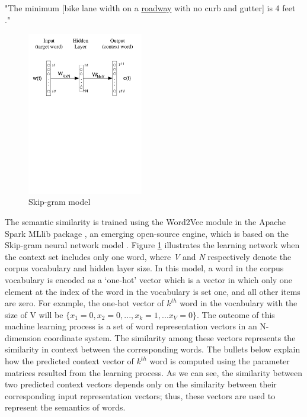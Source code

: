 \documentclass[Journal, BackFigs,NoLists, DoubleSpace]{ascelike}%
\begin{document}
%
\begin{center}
	"The minimum [bike lane width on a \underline{roadway} with no curb and gutter] is 4 feet ."
\end{center}
%
\begin{figure}[t]
	\centering
	\includegraphics[width=0.45\textwidth]{Figure4_skip-gram-model}
	\caption{Skip-gram model}
	\label{fig:skip-gram}
\end{figure}
%
The semantic similarity is trained using the Word2Vec module in the Apache Spark MLlib package \cite{apache16}, an emerging open-source engine, which is based on the Skip-gram neural network model \cite{mikolov13a}. Figure \ref{fig:skip-gram} illustrates the learning network when the context set includes only one word, where \textit{V} and \textit{N} respectively denote the corpus vocabulary and hidden layer size. In this model, a word in the corpus vocabulary is encoded as a `one-hot' vector which is a vector in which only one element at the index of the word in the vocabulary is set one, and all other items are zero. For example, the one-hot vector of $k^{th}$ word in the vocabulary with the size of V will be $\{x_1=0, x_2=0, ..., x_k=1,...x_V=0\}$. The outcome of this machine learning process is a set of word representation vectors in an N-dimension coordinate system. The similarity among these vectors represents the similarity in context between the corresponding words. The bullets below explain how the predicted context vector of $k^{th}$ word is computed using the parameter matrices resulted from the learning process. As we can see, the similarity between two predicted context vectors depends only on the similarity between their corresponding input representation vectors; thus, these vectors are used to represent the semantics of  words. 
\end{document}
